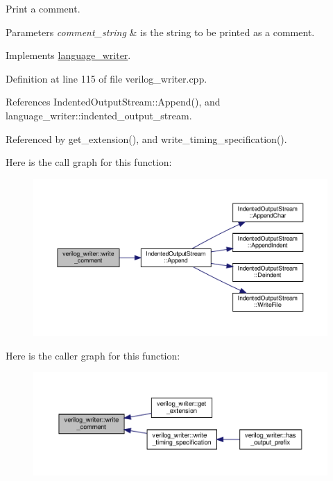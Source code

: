 Print a comment. 


\begin{DoxyParams}{Parameters}
{\em comment\+\_\+string} & is the string to be printed as a comment. \\
\hline
\end{DoxyParams}


Implements \hyperlink{classlanguage__writer_acb35eb2c22883fcf1f479a091dc4429d}{language\+\_\+writer}.



Definition at line 115 of file verilog\+\_\+writer.\+cpp.



References Indented\+Output\+Stream\+::\+Append(), and language\+\_\+writer\+::indented\+\_\+output\+\_\+stream.



Referenced by get\+\_\+extension(), and write\+\_\+timing\+\_\+specification().

Here is the call graph for this function\+:
\nopagebreak
\begin{figure}[H]
\begin{center}
\leavevmode
\includegraphics[width=350pt]{d8/dba/classverilog__writer_ab013209d73c10f53c87bb1b7a2666ff0_cgraph}
\end{center}
\end{figure}
Here is the caller graph for this function\+:
\nopagebreak
\begin{figure}[H]
\begin{center}
\leavevmode
\includegraphics[width=350pt]{d8/dba/classverilog__writer_ab013209d73c10f53c87bb1b7a2666ff0_icgraph}
\end{center}
\end{figure}
\mbox{\label{classverilog__writer_a0e4f86c1473978b5c7284b763db4e55a}} 
